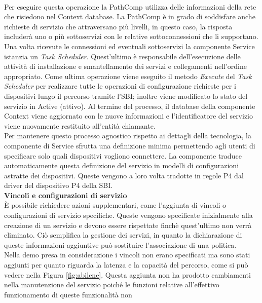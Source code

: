 \\Per eseguire questa operazione la PathComp utilizza delle informazioni della rete che risiedono nel Context database.
La PathComp è in grado di soddisfare anche richieste di servizio che attraversano più livelli, in questo caso, la risposta includerà uno o più sottoservizi con le relative sottoconnessioni che li supportano.
\\Una volta ricevute le connessioni ed eventuali sottoservizi la componente Service istanzia un \textit{Task Scheduler}. %
Quest'ultimo è responsabile dell'esecuzione delle attività di installazione e smantellamento dei servizi e collegamenti nell'ordine appropriato.
Come ultima operazione viene eseguito il metodo \textit{Execute} del \textit{Task Scheduler} per realizzare tutte le operazioni di configurazione richieste per i dispositivi lungo il percorso tramite l'SBI; inoltre viene modificato lo stato del servizio in Active (attivo).
Al termine del processo, il database della componente Context viene aggiornato con le nuove informazioni e l'identificatore del servizio viene nuovamente restituito all'entità chiamante.
\\Per mantenere questo processo agnostico rispetto ai dettagli della tecnologia, la componente di Service 
sfrutta una definizione minima permettendo agli utenti di specificare solo quali dispositivi vogliono connettere.
La componente traduce automaticamente questa definizione del servizio in modelli di configurazioni astratte dei dispositivi. 
Queste vengono a loro volta tradotte in regole P4 dal driver del dispositivo P4 della SBI.
\\\textbf{Vincoli e configurazioni di servizio}
\\È possibile richiedere azioni supplementari, come l'aggiunta di vincoli o configurazioni di servizio specifiche. 
Queste vengono specificate inizialmente alla creazione di un servizio e devono essere rispettate finchè quest'ultimo non verrà eliminato. 
Ciò semplifica la gestione dei servizi, in quanto la dichiarazione di queste informazioni aggiuntive può sostituire l'associazione di una politica.
\\Nella demo presa in considerazione i vincoli non erano specificati ma sono stati aggiunti per quanto riguarda la latenza e la capacità del percorso, 
come si può vedere nella Figura \ref{fig:abilene}.
Questa aggiunta non ha prodotto cambiamenti nella manutenzione del servizio poiché le funzioni relative all'effettivo funzionamento di queste funzionalità non 
